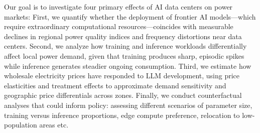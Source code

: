 \documentclass[sigconf]{acmart}
\begin{document}
Our goal is to investigate four primary effects of AI data centers on power markets: First, we quantify whether the deployment of frontier AI models—which require extraordinary computational resources—coincides with measurable declines in regional power quality indices and frequency distortions near data centers. Second, we analyze how training and inference workloads differentially affect local power demand, given that training produces sharp, episodic spikes while inference generates steadier ongoing consumption. Third, we estimate how wholesale electricity prices have responded to LLM development, using price elasticities and treatment effects to approximate demand sensitivity and geographic price differentials across zones. Finally, we conduct counterfactual analyses that could inform policy: assessing different scenarios of parameter size, training versus inference proportions, edge compute preference, relocation to low-population areas etc.




\end{document}

